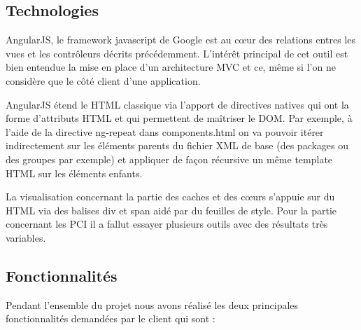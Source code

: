 \documentclass [a4paper,11pt]{article}
\begin{document}
\subsection{Technologies}
AngularJS, le framework javascript de Google est au cœur des relations entres les vues et les contrôleurs décrits précédemment. L’intérêt principal de cet outil est bien entendue la mise en place d’un architecture MVC et ce, même si l’on ne considère que le côté client d’une application.
\newline

AngularJS étend le HTML classique via l’apport de directives natives qui ont la forme d’attributs HTML et qui permettent de maîtriser le DOM. Par exemple, à l’aide de la directive ng-repeat dans components.html on va pouvoir itérer indirectement sur les éléments parents du fichier XML de base (des packages ou des groupes par exemple) et appliquer de façon récursive un même template HTML sur les éléments enfants.
\newline

La visualisation concernant la partie des caches et des cœurs s’appuie sur du HTML via des balises div et span aidé par du feuilles de style. Pour la partie concernant les PCI il a fallut essayer plusieurs outils avec des résultats très variables.

\subsection{Fonctionnalités}

Pendant l'ensemble du projet nous avons réalisé les deux principales fonctionnalités demandées par le client qui sont : \newline
\end{document}
